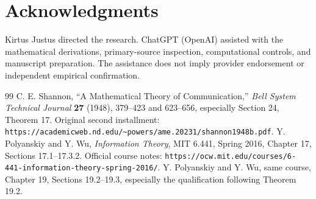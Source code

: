 \documentclass{article}
\begin{document}
\section*{Acknowledgments}
Kirtus Justus directed the research. ChatGPT (OpenAI) assisted with the mathematical derivations, primary-source inspection, computational controls, and manuscript preparation. The assistance does not imply provider endorsement or independent empirical confirmation.

\begin{thebibliography}{99}
 C. E. Shannon, ``A Mathematical Theory of Communication,'' \emph{Bell System Technical Journal} \textbf{27} (1948), 379--423 and 623--656, especially Section 24, Theorem 17. Original second installment: \texttt{https://academicweb.nd.edu/\~{}powers/ame.20231/shannon1948b.pdf}.
 Y. Polyanskiy and Y. Wu, \emph{Information Theory}, MIT 6.441, Spring 2016, Chapter 17, Sections 17.1--17.3.2. Official course notes: \texttt{https://ocw.mit.edu/courses/6-441-information-theory-spring-2016/}.
 Y. Polyanskiy and Y. Wu, same course, Chapter 19, Sections 19.2--19.3, especially the qualification following Theorem 19.2.
\end{thebibliography}
\end{document}
